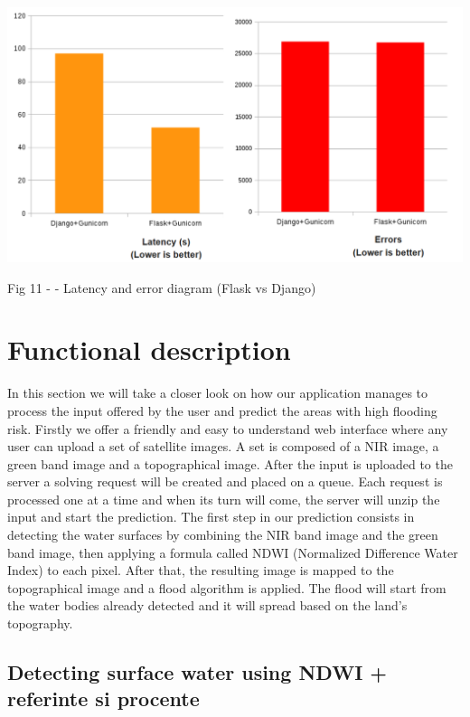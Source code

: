 \documentclass[12pt, a4paper]{report}
\begin{document}
\medskip
\includegraphics[scale=0.6, center]{django-flask-latency.png}
\begin{center}
Fig 11 - \cite{Flask2} - Latency and error diagram (Flask vs Django)
\end{center}




\section{Functional description}

\quad
In this section we will take a closer look on how our application manages to process the input offered by the user and predict the areas with high flooding risk. Firstly we offer a friendly and easy to understand web interface where any user can upload a set of satellite images. A set is composed of a NIR image, a green band image and a topographical image.
 After the input is uploaded to the server a solving request will be created and placed on a queue. Each request is processed one at a time and when its turn will come, the server will unzip the input and start the prediction. The first step in our prediction consists in detecting the water surfaces by combining the NIR band image and the green band image, then applying a formula called NDWI (Normalized Difference Water Index) to each pixel. After that, the resulting image is mapped to the topographical image and a flood algorithm is applied. The flood will start from the water bodies already detected and it will spread based on the land's topography.

\newpage
\subsection{Detecting surface water using NDWI + referinte si procente}
\quad 
\end{document}
